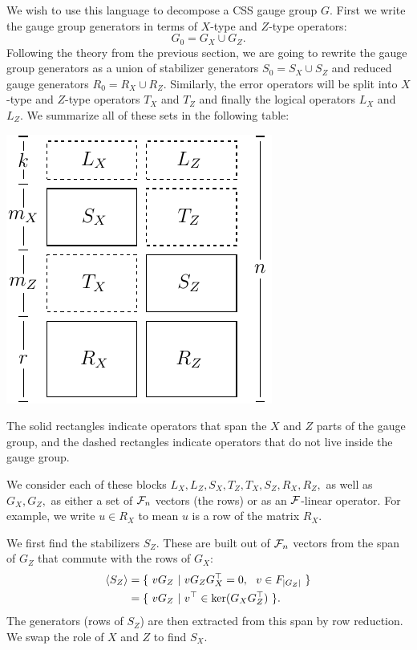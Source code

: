 We wish to use this language to decompose a CSS gauge group $G.$
First we write the gauge group generators in terms of
$X$-type and $Z$-type operators:
$$
    G_0 = G_X \cup G_Z.
$$
Following the theory from the previous section,
we are going to rewrite the gauge group generators
as a union of stabilizer generators $S_0 = S_X \cup S_Z$
and reduced gauge generators $R_0 = R_X \cup R_Z.$
Similarly, the error operators
will be split into $X$-type and $Z$-type
operators $T_X$ and $T_Z$ and
finally the logical operators
$L_X$ and $L_Z.$
We summarize all of these sets
in the following table:
\begin{center}
\includegraphics[]{pic-symplectic.pdf}
\end{center}
The solid rectangles indicate operators that
span the $X$ and $Z$ parts of the gauge group,
and the dashed rectangles indicate operators that
do not live inside the gauge group.

We consider each of these blocks 
$L_X, L_Z, S_X, T_Z, T_X, S_Z, R_X, R_Z,$
as well as $G_X,G_Z,$
as either a set of $\mathcal{F}_{n}$ vectors (the rows) or as an 
$\mathcal{F}$-linear operator.
For example, we write $u\in R_X$ to mean $u$ is 
a row of the matrix $R_X$.

We first find the stabilizers $S_Z$.
These are built out of $\mathcal{F}_{n}$ vectors from the span of $G_Z$
that commute with the rows of $G_X:$
\begin{align*}
    \Span{S_Z} &= \{\  vG_Z \ |\  v G_Z G_X^\top = 0, \ \ v \in F_{|G_Z|}\ \} \\
               &= \{\  vG_Z \ |\  v^\top \in \Ker(G_X G_Z^\top)  \ \}.
\end{align*}
The generators (rows of $S_Z$) are then extracted
from this span by row reduction.
We swap the role of $X$ and $Z$ to find $S_X.$

